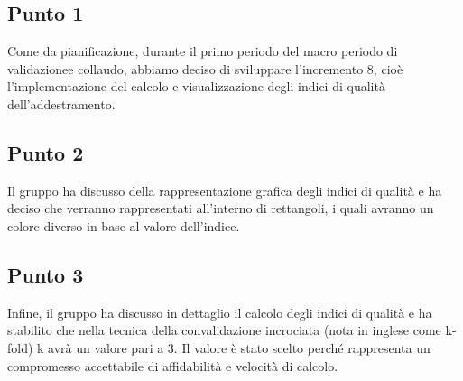     \subsection{Punto 1}
     Come da pianificazione, durante il primo periodo del macro periodo di validazione\glosp e collaudo, abbiamo deciso di sviluppare l'incremento 8, cioè l'implementazione del calcolo e visualizzazione degli indici di qualità dell'addestramento.
    \subsection{Punto 2}
    Il gruppo ha discusso della rappresentazione grafica degli indici di qualità e ha deciso che verranno rappresentati all'interno di rettangoli, i quali avranno un colore diverso in base al valore dell'indice.
    \subsection{Punto 3}
    Infine, il gruppo ha discusso in dettaglio il calcolo degli indici di qualità e ha stabilito che nella tecnica della convalidazione incrociata (nota in inglese come k-fold) k avrà un valore pari a 3. Il valore è stato scelto perché rappresenta un compromesso accettabile di affidabilità e velocità di calcolo.
        
